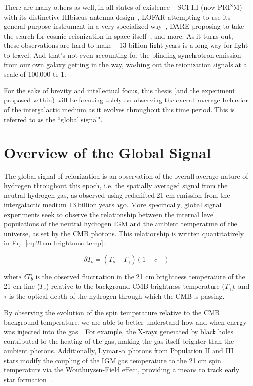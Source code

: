 There are many others as well, in all states of existence -- SCI-HI (now 
PRI$^\mathrm{Z}$M) with its distinctive HIbiscus antenna 
design~\citep{voytek2014}, LOFAR attempting to use its general purpose 
instrument in a very specialized way~\citep{rottgering2006}, DARE proposing to 
take the search for cosmic reionization in space itself~\citep{burns2012}, and 
more. As it turns out, these observations are hard to make -- 13 billion light 
years is a long way for light to travel. And that's not even accounting for the 
blinding synchrotron emission from our own galaxy getting in the way, washing 
out the reionization signals at a scale of 100,000 to 1.

For the sake of brevity and intellectual focus, this thesis (and the experiment 
proposed within) will be focusing solely on observing the overall average 
behavior of the intergalactic medium as it evolves throughout this time period.  
This is referred to as the ``global signal".

\section{Overview of the Global Signal}
\label{sec:global-signal-overview}

The global signal of reionization is an observation of the overall average 
nature of hydrogen throughout this epoch, i.e. the spatially averaged signal 
from the neutral hydrogen gas, as observed using redshifted 21 cm emission from 
the intergalactic medium 13 billion years ago. More specifically, global signal 
experiments seek to observe the relationship between the internal level 
populations of the neutral hydrogen IGM and the ambient temperature of the 
universe, as set by the CMB photons.  This relationship is written 
quantitatively in Eq.~\eqref{eq:21cm-brightness-temp}.

\begin{equation}
    \delta T_b = (T_s - T_\gamma)(1 - e^{-\tau})
    \label{eq:21cm-brightness-temp}
\end{equation}

\noindent where $\delta T_b$ is the observed fluctuation in the 21 cm 
brightness temperature of the 21 cm line ($T_s$) relative to the background CMB 
brightness temperature ($T_\gamma$), and $\tau$ is the optical depth of the 
hydrogen through which the CMB is passing. 

By observing the evolution of the spin temperature relative to the CMB 
background temperature, we are able to better understand how and when energy 
was injected into the gas~\citep{pritchard-loeb2010}. For example, the X-rays 
generated by black holes contributed to the heating of the gas, making the gas 
itself brighter than the ambient photons. Additionally, Lyman-$\alpha$ photons 
from Population II and III stars modify the coupling of the IGM gas temperature 
to the 21 cm spin temperature via the Wouthuysen-Field effect, providing a 
means to track early star formation~\citep{furlanetto2006}.

